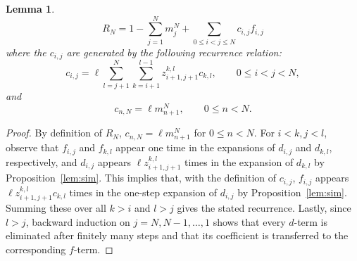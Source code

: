 \documentclass[pdflatex,sn-mathphys-num]{sn-jnl}%
\theoremstyle{thmstyleone}%
\theoremstyle{thmstyletwo}%
\theoremstyle{thmstylethree}%
\newtheorem{lemma}{Lemma}%
\begin{document}


 \begin{lemma}\label{lem:diff-rec}
    \[R_N = 1-\sum^N_{j=1}m^N_j+\sum_{0\le i<j\le N} c_{i,j}f_{i,j}\]
where the $c_{i,j}$ are generated by the following recurrence relation:
\[c_{i,j}=\ell\sum_{l=j+1}^{N} \sum_{k=i+1}^{l-1} z^{k,l}_{i+1,j+1}c_{k,l},\qquad 0\le i<j<N,\]and \[c_{n,N}=\ell m^N_{n+1},\qquad 0\le n<N.\]
\end{lemma}
\begin{proof}
    By definition of $R_N$, $c_{n,N}=\ell m^N_{n+1}$ for $0\le n<N$. For $i<k, j<l$, observe that $f_{i,j}$ and $f_{k,l}$ appear one time in the expansions of $d_{i,j}$ and $d_{k,l}$, respectively, and $d_{i,j}$ appears $\ell z^{k,l}_{i+1,j+1}$ times in the expansion of $d_{k,l}$ by Proposition~\ref{lem:sim}. This implies that, with the definition of $c_{i,j}$, $f_{i,j}$ appears $\ell z^{k,l}_{i+1,j+1}c_{k,l}$ times in the one-step expansion of $d_{i,j}$ by Proposition~\ref{lem:sim}. Summing these over all $k>i$ and $l>j$ gives the stated recurrence. Lastly, since $l>j$, backward induction on $j=N,N-1,\dots,1$ shows that every $d$-term is eliminated after finitely many steps and that its coefficient is transferred to the corresponding $f$-term. 
\end{proof}
\end{document}
